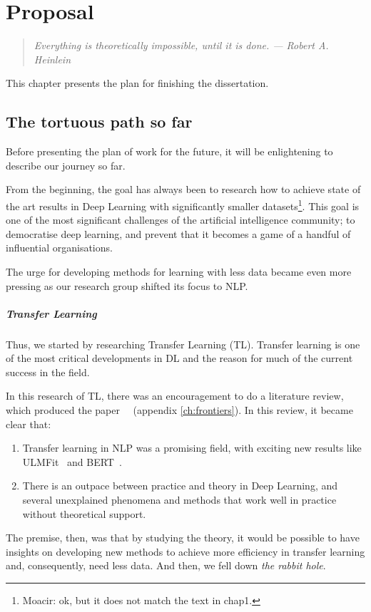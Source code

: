 

\chapter{Proposal}\label{ch:proposal}

\begin{quotation}
	\small \textit{ \flushright
	Everything is theoretically impossible, until it is done.
	\flushright --- Robert A. Heinlein \\
	\vspace{1cm}}
\end{quotation}


This chapter presents the plan for finishing the dissertation.


\section{The tortuous path so far} Before presenting the plan of work for the future, it will be enlightening to describe our journey so far.

From the beginning, the goal has always been to research how to achieve state of the art results in Deep Learning with significantly smaller datasets\footnote{Moacir: ok, but it does not match the text in chap1. }. This goal is one of the most significant challenges of the artificial intelligence community; to democratise deep learning, and prevent that it becomes a game of a handful of influential organisations.

The urge for developing methods for learning with less data became even more pressing as our research group shifted its focus to \acf{NLP}.

\paragraph{Transfer Learning} Thus, we started by researching Transfer Learning (TL). Transfer learning is one of the most critical developments in \acs{DL} and the reason for much of the current success in the field.

In this research of TL, there was an encouragement to do a literature review, which produced the paper~~\cite{guth:2019} (appendix \ref{ch:frontiers}). In this review, it became clear that:
\begin{enumerate}
	\item Transfer learning in NLP was a promising field, with exciting new results like ULMFit~\cite{howard:2018universal} and BERT~\cite{devlin:2018}.
	\item There is an outpace between practice and theory in Deep Learning, and several unexplained phenomena and methods that work well in practice without theoretical support.
\end{enumerate}
The premise, then, was that by studying the theory, it would be possible to have insights on developing new methods to achieve more efficiency in transfer learning and, consequently, need less data. And then, we fell down \emph{the rabbit hole}.

